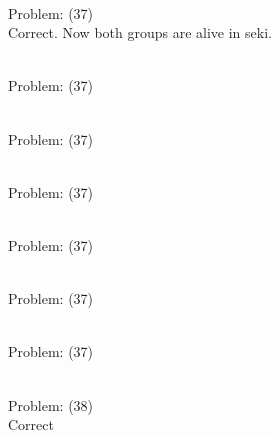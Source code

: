 \documentclass[11pt]{article}
\begin{document}
\begin{minipage}[t]{0.5\textwidth}
  {\centering
  
\\
Problem: (37)\\
Correct. Now both groups are alive in seki.\\
  }
\end{minipage}
\begin{minipage}[t]{0.5\textwidth}
  {\centering
  
\\
Problem: (37)\\
  }
\end{minipage}
\begin{minipage}[t]{0.5\textwidth}
  {\centering
  
\\
Problem: (37)\\
  }
\end{minipage}
\begin{minipage}[t]{0.5\textwidth}
  {\centering
  
\\
Problem: (37)\\
  }
\end{minipage}
\begin{minipage}[t]{0.5\textwidth}
  {\centering
  
\\
Problem: (37)\\
  }
\end{minipage}
\begin{minipage}[t]{0.5\textwidth}
  {\centering
  
\\
Problem: (37)\\
  }
\end{minipage}
\begin{minipage}[t]{0.5\textwidth}
  {\centering
  
\\
Problem: (37)\\
  }
\end{minipage}
\begin{minipage}[t]{0.5\textwidth}
  {\centering
  
\\
Problem: (38)\\
Correct\\
  }
\end{minipage}
\end{document}
